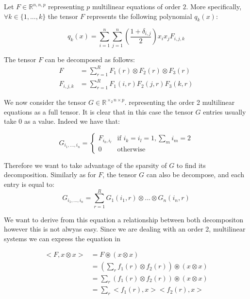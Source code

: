 \documentclass{article}
\begin{document}
Let $F \in \mathbb{R}^{n,n,p}$ representing $p$ multilinear 
equations of order $2$. More specifically, $\forall k \in \{1,...,k\}$
the tensor $F$ represents the following polynomial $q_k(x)$: 

\begin{equation}
    q_k(x) = \sum_{i=1}^n \sum_{j=1}^n (\frac{1+\delta_{i,j}}{2}) x_i x_j F_{i,j,k}  
\end{equation}

The tensor $F$ can be decomposed as follows: 
\begin{align}
    F &= \sum_{r = 1}^R F_1(r) \otimes F_2(r) \otimes F_3(r) \\
    F_{i,j,k} &=\sum_{r = 1}^R F_1(i,r) F_2(j,r) F_3(k,r) 
\end{align}

We now consider the tensor $G \in \mathbb{R}^{\times_2n \times p}$. 
representing the order 2 multilinear equations as a full tensor. 
It is clear that in this case the tensor $G$ entries usually
take $0$ as a value. Indeed we have that:

\begin{equation}
    G_{i_1,...,i_n} = \left\{
        \begin{array}{ll}
            F_{i_k, i_l} & \text{if } i_k = i_l = 1, \sum_m i_m = 2\\
            0 & \text{otherwise}
        \end{array}
    \right.
\end{equation}


Therefore we want to take advantage of the sparsity of $G$ to find its 
decomposition.
Similarly as for $F$, the tensor $G$ can also be decompose, and each entry is equal to:
\begin{equation}
    G_{i_1,...,i_n} = \sum_{r = 1}^R G_1(i_1,r)\otimes ...\otimes G_n(i_n,r) 
\end{equation}

We want to derive from this equation a relationship between 
both decompositon however this is not alwyas easy.
Since we are dealing with an order 2, multilinear systems
we can express the equation in 

\begin{align}
    <F, x \otimes x> &= F \circledast (x \otimes x) \\
    &= (\sum_r f_1(r) \otimes f_2(r) ) \circledast (x \otimes x) \\
    &= \sum_r( f_1(r) \otimes f_2(r) ) \circledast (x \otimes x) \\
    &= \sum_r <f_1(r), x> <f_2(r), x> \\
\end{align}
\end{document}
